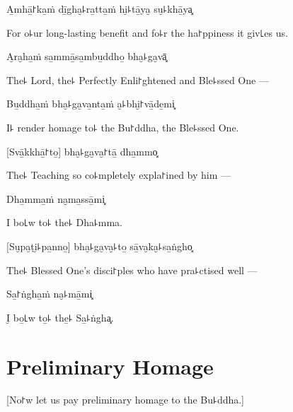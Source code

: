 A̱mhā̱꜓ka̱ṁ dī̱gha̮꜕ra̱tta̱ṁ hi̮꜕tā̱ya̮ su̮꜕khā̱ya͓

\begin{english}
For o꜕ur long-lasting benefit and fo꜕r the ha꜓ppiness it giv꜖es us.
\end{english}

\clearpage

A̮ra̮ha̱ṁ sa̱mmā̱sa̱mbu̱ddho̱ bha̮꜕ga̮vā͓

\begin{english}
The꜕ Lord, the꜕ Perfectly Enli꜓ghtened and Ble꜕ssed One ---
\end{english}

Bu̱ddha̱ṁ bha̮꜕ga̮va̱nta̱ṁ a̮꜕bhi̮꜓vā̱de̱mi͓

\begin{english}
  I꜕ render homage to꜕ the Bu꜓ddha, the Ble꜕ssed One.
\end{english}

[Svā̱kkhā̱꜓to̱] bha̮꜕ga̮va̮꜓tā̱ dha̱mmo͓

\begin{english}
  The꜕ Teaching so co꜕mpletely expla꜓ined by him ---
\end{english}

Dha̱mma̱ṁ na̮ma̱ssā̱mi͓

\begin{english}
  I bo꜖w to꜕ the꜕ Dha꜕mma.
\end{english}

[Su̮pa̮ṭi̮꜕pa̱nno̱] bha̮꜕ga̮va̮꜕to̱ sā̱va̮ka̮꜕sa̱ṅgho͓

\begin{english}
The꜕ Blessed One's disci꜓ples who have pra꜕ctised well ---
\end{english}

Sa̱꜓ṅgha̱ṁ na̮꜕mā̱mi͓

\begin{english}
  I̮ bo̱꜖w to̱꜕ the̱꜕ Sa̱꜕ṅgha͓.
\end{english}

\chapter{Preliminary Homage}

\begin{leader}
\end{leader}

\begin{english}
  [No꜓w let us pay preliminary homage to the Bu꜕ddha.]
\end{english}


